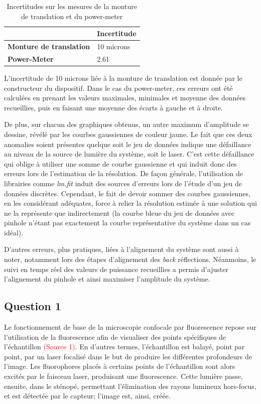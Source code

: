 \documentclass[11pt,letterpaper]{article}
\begin{document}
\begin{table}[H]
\centering
\begin{tabular}{|p{4.8cm}|p{4.2cm}|}
\cline{2-2}
\multicolumn{1}{c|}{} & \textbf{Incertitude} \\
\hline
\textbf{Monture de translation} & 10 microns\\
\hline
\textbf{Power-Meter} & 2.61\\
\hline
\end{tabular}
\caption{Incertitudes sur les mesures de la monture de translation et du power-meter}
\label{incertitudes}
\end{table}

L'incertitude de 10 microns liée à la monture de translation est donnée par le constructeur du dispositif. Dans le cas du power-meter, ces erreurs ont été calculées en prenant les valeurs maximales, minimales et moyenne des données recueillies, puis en faisant une moyenne des écarts à gauche et à droite. 

De plus, sur chacun des graphiques obtenus, un autre maximum d'amplitude se dessine, révélé par les courbes gaussiennes de couleur jaune. Le fait que ces deux anomalies soient présentes quelque soit le jeu de données indique une défaillance au niveau de la source de lumière du système, soit le laser. C'est cette défaillance qui oblige à utiliser une somme de courbe gaussienne et qui induit donc des erreurs lors de l'estimation de la résolution. De façon générale, l'utilisation de librairies comme \textit{lm.fit} induit des sources d'erreurs lors de l'étude d'un jeu de données discrètes. Cependant, le fait de devoir sommer des courbes gaussiennes, en les considérant adéquates, force à relier la résolution estimée à une solution qui ne la représente que indirectement (la courbe bleue du jeu de données avec pinhole n'étant pas exactement la courbe représentative du système dans un cas idéal).

D'autres erreurs, plus pratiques, liées à l'alignement du système sont aussi à noter, notamment lors des étapes d'alignement des \textit{back} réflections. Néanmoins, le suivi en temps réel des valeurs de puissance recueillies a permis d'ajuster l'alignement du pinhole et ainsi maximiser l'amplitude du système. 

\subsection{Question 1}
Le fonctionnement de base de la microscopie confocale par fluorescence repose sur l'utilisation de la fluorescence afin de visualiser des points spécifiques de l'échantillon \textcolor{red}{(Source 1)}. En d'autres termes, l'échantillon est balayé, point par point, par un laser focalisé dans le but de produire les différentes profondeurs de l'image. Les fluorophores placés à certains points de l'échantillon sont alors excités par le faisceau laser, produisant une fluorescence. Cette lumière passe, ensuite, dans le sténopé, permettant l'élimination des rayons lumineux hors-focus, et est détectée par le capteur; l'image est, ainsi, créée.
\end{document}
